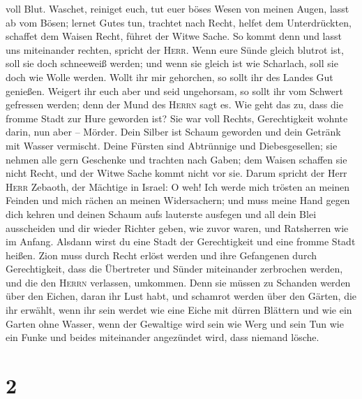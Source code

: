 voll Blut.  Waschet, reiniget euch, tut euer böses Wesen
von meinen Augen, lasst ab vom Bösen;  lernet Gutes tun,
trachtet nach Recht, helfet dem Unterdrückten, schaffet dem Waisen
Recht, führet der Witwe Sache.  So kommt denn und lasst
uns miteinander rechten, spricht der \textsc{Herr}. Wenn eure Sünde
gleich blutrot ist, soll sie doch schneeweiß werden; und wenn sie gleich
ist wie Scharlach, soll sie doch wie Wolle werden.  Wollt
ihr mir gehorchen, so sollt ihr des Landes Gut genießen. 
Weigert ihr euch aber und seid ungehorsam, so sollt ihr vom Schwert
gefressen werden; denn der Mund des \textsc{Herrn} sagt es.
 Wie geht das zu, dass die fromme Stadt zur Hure geworden
ist? Sie war voll Rechts, Gerechtigkeit wohnte darin, nun aber --
Mörder.  Dein Silber ist Schaum geworden und dein Getränk
mit Wasser vermischt.  Deine Fürsten sind Abtrünnige und
Diebesgesellen; sie nehmen alle gern Geschenke und trachten nach Gaben;
dem Waisen schaffen sie nicht Recht, und der Witwe Sache kommt nicht vor
sie.  Darum spricht der Herr \textsc{Herr} Zebaoth, der
Mächtige in Israel: O weh! Ich werde mich trösten an meinen Feinden und
mich rächen an meinen Widersachern;  und muss meine Hand
gegen dich kehren und deinen Schaum aufs lauterste ausfegen und all dein
Blei ausscheiden  und dir wieder Richter geben, wie zuvor
waren, und Ratsherren wie im Anfang. Alsdann wirst du eine Stadt der
Gerechtigkeit und eine fromme Stadt heißen.  Zion muss
durch Recht erlöst werden und ihre Gefangenen durch Gerechtigkeit,
 dass die Übertreter und Sünder miteinander zerbrochen
werden, und die den \textsc{Herrn} verlassen, umkommen. 
Denn sie müssen zu Schanden werden über den Eichen, daran ihr Lust habt,
und schamrot werden über den Gärten, die ihr erwählt, 
wenn ihr sein werdet wie eine Eiche mit dürren Blättern und wie ein
Garten ohne Wasser,  wenn der Gewaltige wird sein wie
Werg und sein Tun wie ein Funke und beides miteinander angezündet wird,
dass niemand lösche.

\hypertarget{section-1}{%
\section{2}\label{section-1}}

